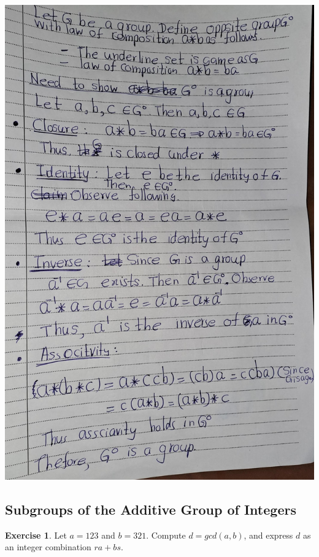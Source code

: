 \documentclass[
]{book}
\theoremstyle{definition}
\theoremstyle{definition}
\theoremstyle{definition}
\newtheorem{exercise}{Exercise}[chapter]
\theoremstyle{definition}
\theoremstyle{remark}
\begin{document}
\includegraphics{figures/ch_2/fig19.jpg}

\hypertarget{subgroups-of-the-additive-group-of-integers-1}{%
\subsection{Subgroups of the Additive Group of Integers}\label{subgroups-of-the-additive-group-of-integers-1}}

\begin{exercise}
\protect\hypertarget{exr:unnamed-chunk-53}{}\label{exr:unnamed-chunk-53}Let \(a = 123\) and \(b = 321\).
Compute \(d = gcd(a, b)\), and express \(d\) as an integer
combination \(ra + bs\).
\end{exercise}
\end{document}
